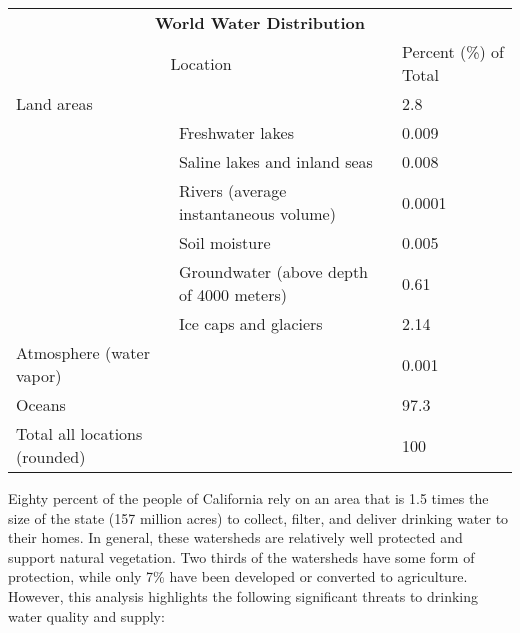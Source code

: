 \documentclass{article}
\begin{document}
\begin{table}[]
\begin{tabular}{lll}
\multicolumn{3}{c}{{\color[HTML]{3166FF} \textbf{World Water Distribution}}}                                            \\
\multicolumn{2}{c}{{\color[HTML]{FD6864} Location}}                      & {\color[HTML]{FE996B} Percent (\%) of Total} \\
Land areas                    &                                          & 2.8                                          \\
                              & Freshwater lakes                         & 0.009                                        \\
                              & Saline lakes and inland seas             & 0.008                                        \\
                              & Rivers (average instantaneous volume)    & 0.0001                                       \\
                              & Soil moisture                            & 0.005                                        \\
                              & Groundwater (above depth of 4000 meters) & 0.61                                         \\
                              & Ice caps and glaciers                    & 2.14                                         \\
Atmosphere (water vapor)      &                                          & 0.001                                        \\
Oceans                        &                                          & 97.3                                         \\
Total all locations (rounded) &                                          & 100                                         
\end{tabular}
\end{table}
Eighty percent of the people of California rely on an area that is 1.5 times the size of the state (157 million acres) to collect, filter, and deliver drinking water to their homes. In general, these watersheds are relatively well protected and support natural vegetation. Two thirds of the watersheds have some form of protection, while only 7\% have been developed or converted to agriculture. However, this analysis highlights the following significant threats to drinking water quality and supply:
\end{document}
